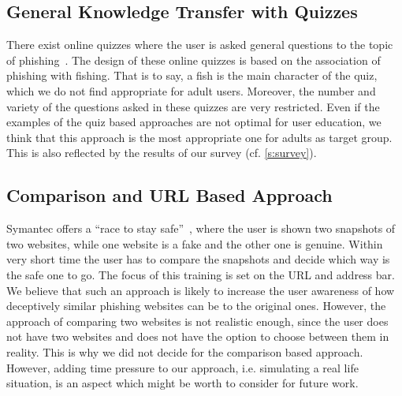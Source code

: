 \subsection{General Knowledge Transfer with Quizzes}
There exist online quizzes where the user is asked general questions to the topic of phishing~\cite{icicibank,onguardonline}. 
The design of these online quizzes is based on the association of phishing with fishing. 
That is to say, a fish is the main character of the quiz, which we do not find appropriate for adult users. 
Moreover, the number and variety of the questions asked in these quizzes are very restricted. 
Even if the examples of the quiz based approaches are not optimal for user education, we think that this approach is the most appropriate one for adults as target group. 
This is also reflected by the results of our survey (cf. \autoref{s:survey}).

\subsection{Comparison and URL Based Approach}
Symantec offers a ``race to stay safe''~\cite{staysafeonline}, where the user is shown two snapshots of two websites, while one website is a fake and the other one is genuine. 
Within very short time the user has to compare the snapshots and decide which way is the safe one to go. 
The focus of this training is set on the URL and address bar. 
We believe that such an approach is likely to increase the user awareness of how deceptively similar phishing websites can be to the original ones. 
However, the approach of comparing two websites is not realistic enough, since the user does not have two websites and does not have the option to choose between them in reality. 
This is why we did not decide for the comparison based approach. 
However, adding time pressure to our approach, i.e. simulating a real life situation, is an aspect which might be worth to consider for future work.



